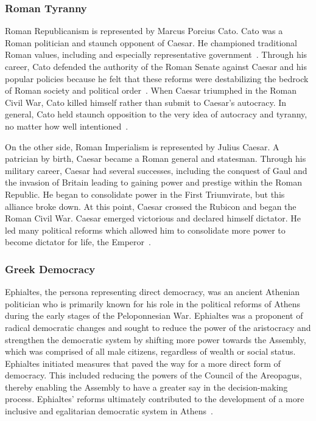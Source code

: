 \documentclass[jair,twoside,11pt,theapa]{article}
\begin{document}
\subsubsection{Roman Tyranny}
Roman Republicanism is represented by Marcus Porcius Cato.  Cato was a Roman politician and staunch opponent of Caesar.  He championed traditional Roman values, including and especially representative government~.  Through his career, Cato defended the authority of the Roman Senate against Caesar and his popular policies because he felt that these reforms were destabilizing the bedrock of Roman society and political order~.  When Caesar triumphed in the Roman Civil War, Cato killed himself rather than submit to Caesar's autocracy.  In general, Cato held staunch opposition to the very idea of autocracy and tyranny, no matter how well intentioned~.

On the other side, Roman Imperialism is represented by Julius Caesar.  A patrician by birth, Caesar became a Roman general and statesman.  Through his military career, Caesar had several successes, including the conquest of Gaul and the invasion of Britain leading to gaining power and prestige within the Roman Republic.  He began to consolidate power in the First Triumvirate, but this alliance broke down.  At this point, Caesar crossed the Rubicon and began the Roman Civil War.  Caesar emerged victorious and declared himself dictator.  He led many political reforms which allowed him to consolidate more power to become dictator for life, the Emperor~.

\subsubsection{Greek Democracy}
Ephialtes, the persona representing direct democracy, was an ancient Athenian politician who is primarily known for his role in the political reforms of Athens during the early stages of the Peloponnesian War.  Ephialtes was a proponent of radical democratic changes and sought to reduce the power of the aristocracy and strengthen the democratic system by shifting more power towards the Assembly, which was comprised of all male citizens, regardless of wealth or social status. Ephialtes initiated measures that paved the way for a more direct form of democracy. This included reducing the powers of the Council of the Areopagus, thereby enabling the Assembly to have a greater say in the decision-making process. Ephialtes' reforms ultimately contributed to the development of a more inclusive and egalitarian democratic system in Athens~.
\end{document}
